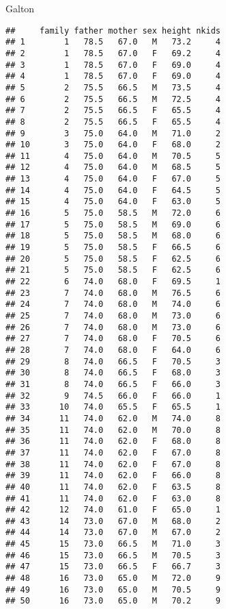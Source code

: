 \documentclass[
]{article}
\newenvironment{Shaded}{\begin{snugshade}}{\end{snugshade}}
\newcommand{\NormalTok}[1]{#1}
\begin{document}
\begin{Shaded}
\begin{Highlighting}[]
\NormalTok{Galton}
\end{Highlighting}
\end{Shaded}

\begin{verbatim}
##     family father mother sex height nkids
## 1        1   78.5   67.0   M   73.2     4
## 2        1   78.5   67.0   F   69.2     4
## 3        1   78.5   67.0   F   69.0     4
## 4        1   78.5   67.0   F   69.0     4
## 5        2   75.5   66.5   M   73.5     4
## 6        2   75.5   66.5   M   72.5     4
## 7        2   75.5   66.5   F   65.5     4
## 8        2   75.5   66.5   F   65.5     4
## 9        3   75.0   64.0   M   71.0     2
## 10       3   75.0   64.0   F   68.0     2
## 11       4   75.0   64.0   M   70.5     5
## 12       4   75.0   64.0   M   68.5     5
## 13       4   75.0   64.0   F   67.0     5
## 14       4   75.0   64.0   F   64.5     5
## 15       4   75.0   64.0   F   63.0     5
## 16       5   75.0   58.5   M   72.0     6
## 17       5   75.0   58.5   M   69.0     6
## 18       5   75.0   58.5   M   68.0     6
## 19       5   75.0   58.5   F   66.5     6
## 20       5   75.0   58.5   F   62.5     6
## 21       5   75.0   58.5   F   62.5     6
## 22       6   74.0   68.0   F   69.5     1
## 23       7   74.0   68.0   M   76.5     6
## 24       7   74.0   68.0   M   74.0     6
## 25       7   74.0   68.0   M   73.0     6
## 26       7   74.0   68.0   M   73.0     6
## 27       7   74.0   68.0   F   70.5     6
## 28       7   74.0   68.0   F   64.0     6
## 29       8   74.0   66.5   F   70.5     3
## 30       8   74.0   66.5   F   68.0     3
## 31       8   74.0   66.5   F   66.0     3
## 32       9   74.5   66.0   F   66.0     1
## 33      10   74.0   65.5   F   65.5     1
## 34      11   74.0   62.0   M   74.0     8
## 35      11   74.0   62.0   M   70.0     8
## 36      11   74.0   62.0   F   68.0     8
## 37      11   74.0   62.0   F   67.0     8
## 38      11   74.0   62.0   F   67.0     8
## 39      11   74.0   62.0   F   66.0     8
## 40      11   74.0   62.0   F   63.5     8
## 41      11   74.0   62.0   F   63.0     8
## 42      12   74.0   61.0   F   65.0     1
## 43      14   73.0   67.0   M   68.0     2
## 44      14   73.0   67.0   M   67.0     2
## 45      15   73.0   66.5   M   71.0     3
## 46      15   73.0   66.5   M   70.5     3
## 47      15   73.0   66.5   F   66.7     3
## 48      16   73.0   65.0   M   72.0     9
## 49      16   73.0   65.0   M   70.5     9
## 50      16   73.0   65.0   M   70.2     9

\end{verbatim}
\end{document}
